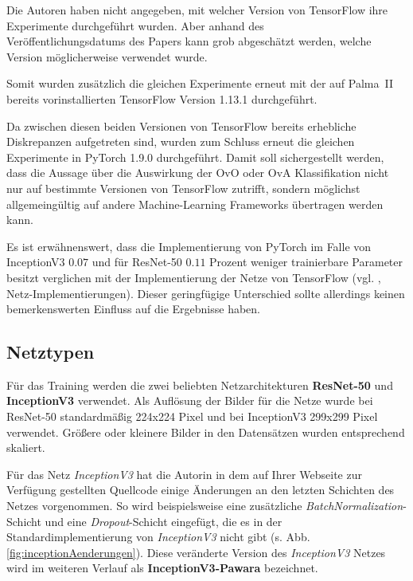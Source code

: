 Die Autoren haben nicht angegeben, mit welcher Version von TensorFlow \cite{tensorflow} ihre Experimente durchgeführt wurden. Aber anhand des\\ Veröffentlichungsdatums des Papers \cite{pawaraPaper} kann grob abgeschätzt werden, welche Version möglicherweise verwendet wurde.

Somit wurden zusätzlich die gleichen Experimente erneut mit der auf Palma~II \cite{palma2} bereits vorinstallierten TensorFlow Version 1.13.1 \cite{tensorflow} durchgeführt.

Da zwischen diesen beiden Versionen von TensorFlow \cite{tensorflow} bereits erhebliche Diskrepanzen aufgetreten sind, wurden zum Schluss erneut die gleichen Experimente in PyTorch 1.9.0 \cite{pytorch} durchgeführt.
Damit soll sichergestellt werden, dass die Aussage über die Auswirkung der OvO oder OvA Klassifikation nicht nur auf bestimmte Versionen von TensorFlow \cite{tensorflow} zutrifft, sondern möglichst allgemeingültig auf andere Machine-Learning Frameworks übertragen werden kann.

Es ist erwähnenswert, dass die Implementierung von PyTorch \cite{pytorch} im Falle von InceptionV3 $0.07$ und für ResNet-50 $0.11$ Prozent weniger trainierbare Parameter besitzt verglichen mit der Implementierung der Netze von TensorFlow \cite{tensorflow} (vgl. \cite{githubRepo}, Netz-Implementierungen). Dieser geringfügige Unterschied sollte allerdings keinen bemerkenswerten Einfluss auf die Ergebnisse haben.

\subsection{Netztypen}
\label{ch:methodik_netze}
Für das Training werden die zwei beliebten Netzarchitekturen \textbf{ResNet-50} und \textbf{InceptionV3} verwendet. Als Auflösung der Bilder für die Netze wurde bei ResNet-50 standardmäßig 224x224 Pixel und bei InceptionV3 299x299 Pixel verwendet. Größere oder kleinere Bilder in den Datensätzen wurden entsprechend skaliert.

Für das Netz \textit{InceptionV3} hat die Autorin in dem auf Ihrer Webseite zur Verfügung gestellten Quellcode \cite{pawaraWebsiteCode} einige Änderungen an den letzten Schichten des Netzes vorgenommen. So wird beispielsweise eine zusätzliche \textit{BatchNormalization}-Schicht und eine \textit{Dropout}-Schicht eingefügt, die es in der Standardimplementierung von \textit{InceptionV3} nicht gibt (s. Abb. \ref{fig:inceptionAenderungen}). Diese veränderte Version des \textit{InceptionV3} Netzes wird im weiteren Verlauf als \textbf{InceptionV3-Pawara} bezeichnet.

